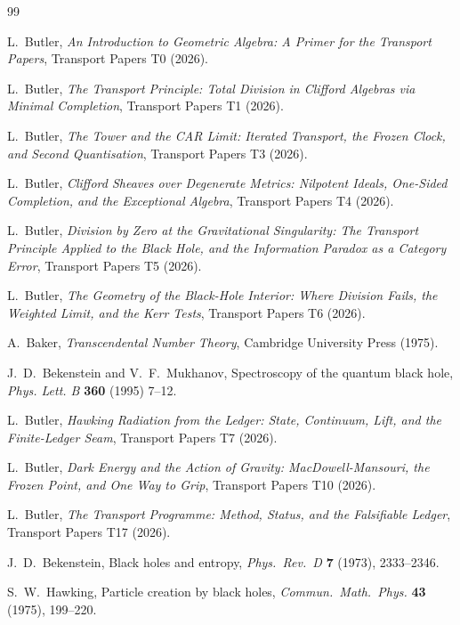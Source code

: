\documentclass[11pt]{article}
\theoremstyle{definition}
\begin{document}
\begin{thebibliography}{99}

L.~Butler,
\emph{An Introduction to Geometric Algebra: A Primer for the Transport Papers},
Transport Papers T0 (2026).

L.~Butler,
\emph{The Transport Principle: Total Division in Clifford Algebras via Minimal Completion},
Transport Papers T1 (2026).

L.~Butler,
\emph{The Tower and the CAR Limit: Iterated Transport, the Frozen Clock, and Second Quantisation},
Transport Papers T3 (2026).

L.~Butler,
\emph{Clifford Sheaves over Degenerate Metrics: Nilpotent Ideals, One-Sided Completion, and the Exceptional Algebra},
Transport Papers T4 (2026).

L.~Butler,
\emph{Division by Zero at the Gravitational Singularity: The Transport Principle Applied to the Black Hole, and the Information Paradox as a Category Error},
Transport Papers T5 (2026).

L.~Butler,
\emph{The Geometry of the Black-Hole Interior: Where Division Fails, the Weighted Limit, and the Kerr Tests},
Transport Papers T6 (2026).

A.~Baker,
\emph{Transcendental Number Theory},
Cambridge University Press (1975).

J.~D.~Bekenstein and V.~F.~Mukhanov,
Spectroscopy of the quantum black hole,
\emph{Phys. Lett. B} \textbf{360} (1995) 7--12.

L.~Butler,
\emph{Hawking Radiation from the Ledger: State, Continuum, Lift, and the Finite-Ledger Seam},
Transport Papers T7 (2026).

L.~Butler,
\emph{Dark Energy and the Action of Gravity: MacDowell-Mansouri, the Frozen Point, and One Way to Grip},
Transport Papers T10 (2026).

L.~Butler,
\emph{The Transport Programme: Method, Status, and the Falsifiable Ledger},
Transport Papers T17 (2026).

J.~D.~Bekenstein,
Black holes and entropy,
\emph{Phys.\ Rev.\ D} \textbf{7} (1973), 2333--2346.

S.~W.~Hawking,
Particle creation by black holes,
\emph{Commun.\ Math.\ Phys.} \textbf{43} (1975), 199--220.


\end{thebibliography}
\end{document}
